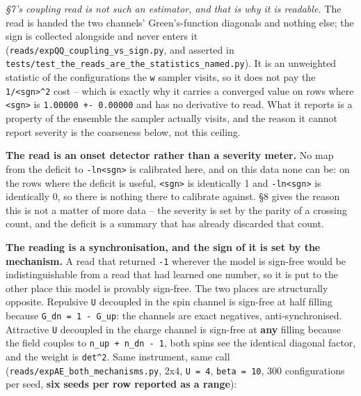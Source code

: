 \documentclass[10pt,letterpaper,twocolumn]{article}
\begin{document}
\emph{§7's coupling read is not such an estimator, and that is why it is readable.} The read is handed
the two channels' Green's-function diagonals and nothing else; the sign is collected alongside and
never enters it (\texttt{reads/\allowbreak{}expQQ\_\allowbreak{}coupling\_\allowbreak{}vs\_\allowbreak{}sign.\allowbreak{}py}, and asserted in
\texttt{tests/\allowbreak{}test\_\allowbreak{}the\_\allowbreak{}reads\_\allowbreak{}are\_\allowbreak{}the\_\allowbreak{}statistics\_\allowbreak{}named.\allowbreak{}py}). It is an unweighted statistic of the
configurations the \texttt{\textbar{}\allowbreak{}w\textbar{}\allowbreak{}} sampler visits, so it does not pay the \texttt{1/\allowbreak{}\textless{}\allowbreak{}sgn\textgreater{}\allowbreak{}\^{}2} cost -- which is
exactly why it carries a converged value on rows where \texttt{\textless{}\allowbreak{}sgn\textgreater{}\allowbreak{}} is \texttt{1.\allowbreak{}00000\ +\allowbreak{}-{}\allowbreak{}\ 0.\allowbreak{}00000} and has no
derivative to read. What it reports is a property of the ensemble the sampler actually visits, and
the reason it cannot report severity is the coarseness below, not this ceiling.

\textbf{The read is an onset detector rather than a severity meter.}
No map from the deficit to \texttt{-{}\allowbreak{}ln\textless{}\allowbreak{}sgn\textgreater{}\allowbreak{}} is calibrated here, and on this data none can be: on the rows
where the deficit is useful, \texttt{\textless{}\allowbreak{}sgn\textgreater{}\allowbreak{}} is identically 1 and \texttt{-{}\allowbreak{}ln\textless{}\allowbreak{}sgn\textgreater{}\allowbreak{}} is identically 0, so there is
nothing there to calibrate against. §8 gives the reason this is not a matter of more data -- the
severity is set by the parity of a crossing count, and the deficit is a summary that has already
discarded that count.

\textbf{The reading is a synchronisation, and the sign of it is set by the mechanism.} A read that
returned \texttt{-{}\allowbreak{}1} wherever the model is sign-free would be indistinguishable from a read that had
learned one number, so it is put to the other place this model is provably sign-free. The two
places are structurally opposite. Repulsive \texttt{U} decoupled in the spin channel is sign-free at half
filling because \texttt{G\_\allowbreak{}dn\ =\allowbreak{}\ 1\ -{}\allowbreak{}\ G\_\allowbreak{}up}: the channels are exact negatives, anti-synchronised. Attractive
\texttt{U} decoupled in the charge channel is sign-free at \textbf{any} filling because the field couples to
\texttt{n\_\allowbreak{}up\ +\allowbreak{}\ n\_\allowbreak{}dn\ -{}\allowbreak{}\ 1}, both spins see the identical diagonal factor, and the weight is \texttt{det\^{}2}. Same
instrument, same call (\texttt{reads/\allowbreak{}expAE\_\allowbreak{}both\_\allowbreak{}mechanisms.\allowbreak{}py}, 2x4, \texttt{\textbar{}\allowbreak{}U\textbar{}\allowbreak{}\ =\allowbreak{}\ 4}, \texttt{beta\ =\allowbreak{}\ 10}, 300
configurations per seed, \textbf{six seeds per row reported as a range}):
\end{document}
